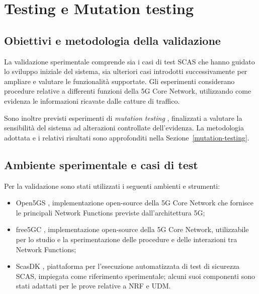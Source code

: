 \chapter{Testing e Mutation testing}\label{testing-e-mutation-testing}

\section{Obiettivi e metodologia della validazione}\label{obiettivi-e-metodologia-della-validazione}

La validazione sperimentale comprende sia i casi di test SCAS che hanno guidato lo sviluppo iniziale del sistema, sia ulteriori casi introdotti successivamente per ampliare e valutare le funzionalità supportate. Gli esperimenti considerano procedure relative a differenti funzioni della 5G Core Network, utilizzando come evidenza le informazioni ricavate dalle catture di traffico.

Sono inoltre previsti esperimenti di \emph{mutation testing} \cite{jia_harman_mutation_2011}, finalizzati a valutare la sensibilità del sistema ad alterazioni controllate dell'evidenza. La metodologia adottata e i relativi risultati sono approfonditi nella Sezione~\ref{mutation-testing}.

\section{Ambiente sperimentale e casi di test}\label{ambiente-sperimentale-e-casi-di-test}

Per la validazione sono stati utilizzati i seguenti ambienti e strumenti:

\begin{itemize}
\tightlist
\item
  Open5GS \cite{open5gs_docs}, implementazione open-source della 5G Core Network che fornisce le principali Network Functions previste dall'architettura 5G;
\item
  free5GC \cite{free5gc_docs}, implementazione open-source della 5G Core Network, utilizzabile per lo studio e la sperimentazione delle procedure e delle interazioni tra Network Functions;
\item
  ScasDK \cite{mancini_scasdk_2025}, piattaforma per l'esecuzione automatizzata di test di sicurezza SCAS, impiegata come riferimento sperimentale; alcuni suoi componenti sono stati adattati per le prove relative a NRF e UDM.
\end{itemize}

